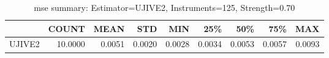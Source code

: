 \begin{table}[ht]
\centering
\caption{mse summary: Estimator=UJIVE2, Instruments=125, Strength=0.70}
\begin{tabular}{lrrrrrrrr}
\toprule
 & COUNT & MEAN & STD & MIN & 25\% & 50\% & 75\% & MAX \\
\midrule
UJIVE2 & 10.0000 & 0.0051 & 0.0020 & 0.0028 & 0.0034 & 0.0053 & 0.0057 & 0.0093 \\
\bottomrule
\end{tabular}
\end{table}

